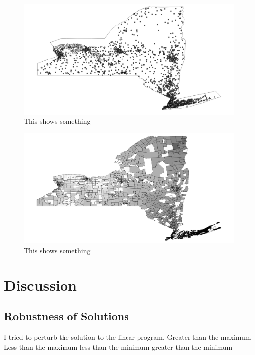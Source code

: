 \documentclass{report}
\begin{document}
\begin{figure}
\centering
\begin{framed}
\includegraphics[scale=.4]{network_243}
\caption{This shows something}
\end{framed}
\end{figure}

\begin{figure}
\centering
\begin{framed}
\includegraphics[scale=.4]{prices_243}
\caption{This shows something}
\end{framed}
\end{figure}


\chapter{Discussion}




\section{Robustness of Solutions}
I tried to perturb the solution to the linear program.
Greater than the maximum
Less than the maximum
less than the minimum
greater than the minimum
\end{document}
